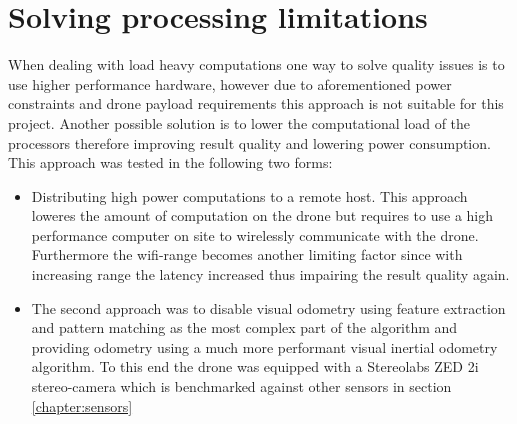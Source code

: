 \section{Solving processing limitations}
When dealing with load heavy computations one way to solve quality issues is to use higher performance hardware, however due to aforementioned power constraints and drone payload requirements this approach is not suitable for this project. 
Another possible solution is to lower the computational load of the processors therefore improving result quality and lowering power consumption. 
This approach was tested in the following two forms:
\begin{itemize}
	
	\item Distributing high power computations to a remote host. This approach loweres the amount of computation on the drone but requires to use a high performance computer on site to wirelessly communicate with the drone. Furthermore the wifi-range becomes another limiting factor since with increasing range the latency increased thus impairing the result quality again.
	
	\item The second approach was to disable visual odometry using feature extraction and pattern matching as the most complex part of the algorithm and providing odometry using a much more performant visual inertial odometry algorithm. To this end the drone was equipped with a Stereolabs ZED 2i stereo-camera which is benchmarked against other sensors in section \ref{chapter:sensors}%
\end{itemize}

